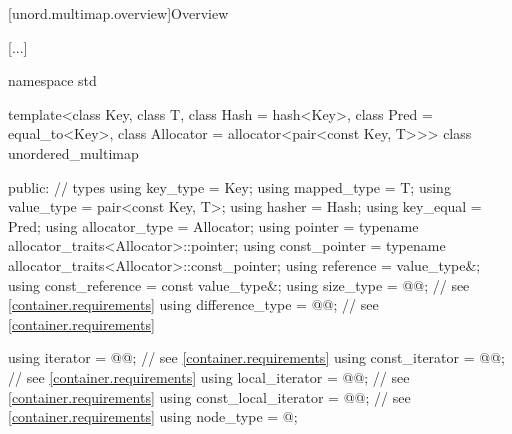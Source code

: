 \documentclass{wg21}
\begin{document}
[unord.multimap.overview]{Overview}

[...]

%
\begin{codeblock}
namespace std {
    template<class Key,
    class T,
    class Hash = hash<Key>,
    class Pred = equal_to<Key>,
    class Allocator = allocator<pair<const Key, T>>>
    class unordered_multimap {
        public:
        // types
        using key_type             = Key;
        using mapped_type          = T;
        using value_type           = pair<const Key, T>;
        using hasher               = Hash;
        using key_equal            = Pred;
        using allocator_type       = Allocator;
        using pointer              = typename allocator_traits<Allocator>::pointer;
        using const_pointer        = typename allocator_traits<Allocator>::const_pointer;
        using reference            = value_type&;
        using const_reference      = const value_type&;
        using size_type            = @@; // see \ref{container.requirements}
        using difference_type      = @@; // see \ref{container.requirements}
        
        using iterator             = @@; // see \ref{container.requirements}
        using const_iterator       = @@; // see \ref{container.requirements}
        using local_iterator       = @@; // see \ref{container.requirements}
        using const_local_iterator = @@; // see \ref{container.requirements}
        using node_type            = @\unspec@;
        
}}
\end{codeblock}
\end{document}
